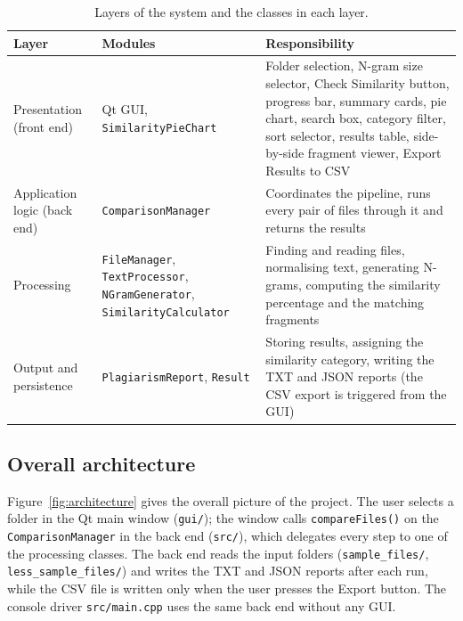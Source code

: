 \documentclass[11pt,a4paper]{report}
\newcommand{\cc}[1]{\texttt{#1}}
\begin{document}
\begin{table}[htbp]
\centering
\small
\begin{tabular}{@{}p{3.0cm} p{3.6cm} p{8.4cm}@{}}
\toprule
Layer & Modules & Responsibility \\
\midrule
Presentation (front end) & Qt GUI, \cc{SimilarityPieChart} &
  Folder selection, N-gram size selector, Check Similarity button, progress bar, summary
  cards, pie chart, search box, category filter, sort selector, results table,
  side-by-side fragment viewer, Export Results to CSV \\
Application logic (back end) & \cc{ComparisonManager} &
  Coordinates the pipeline, runs every pair of files through it and returns the results \\
Processing & \cc{FileManager}, \cc{TextProcessor}, \cc{NGramGenerator},
  \cc{SimilarityCalculator} &
  Finding and reading files, normalising text, generating N-grams, computing the similarity
  percentage and the matching fragments \\
Output and persistence & \cc{PlagiarismReport}, \cc{Result} &
  Storing results, assigning the similarity category, writing the TXT and JSON reports (the
  CSV export is triggered from the GUI) \\
\bottomrule
\end{tabular}
\caption{Layers of the system and the classes in each layer.}
\label{tab:layers}
\end{table}

\subsection{Overall architecture}
Figure~\ref{fig:architecture} gives the overall picture of the project. The user selects a
folder in the Qt main window (\cc{gui/}); the window calls \cc{compareFiles()} on the
\cc{ComparisonManager} in the back end (\cc{src/}), which delegates every step to one of the
processing classes. The back end reads the input folders (\cc{sample\_files/},
\cc{less\_sample\_files/}) and writes the TXT and JSON reports after each run, while the CSV
file is written only when the user presses the Export button. The console driver
\cc{src/main.cpp} uses the same back end without any GUI.
\end{document}
